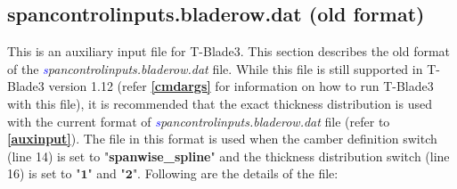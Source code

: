 \documentclass[8pt]{article}
\begin{document}
\subsection{spancontrolinputs.bladerow.dat (old format)}\label{auxinput1}
\noindent
This is an auxiliary input file for T-Blade3. This section describes the old format of the \textit{\textcolor{blue}spancontrolinputs.bladerow.dat} file. While this file is still supported in T-Blade3 version 1.12 (refer \textbf{\ref{cmdargs}} for information on how to run T-Blade3 with this file), it is recommended that the exact thickness distribution is used with the current format of \textit{\textcolor{blue}spancontrolinputs.bladerow.dat} file (refer to \textbf{\ref{auxinput}}). The file in this format is used when the camber definition switch (line 14) is set to "\textbf{spanwise\_spline}" and the thickness distribution switch (line 16) is set to "$\mathbf{1}$" and "$\mathbf{2}$". Following are the details of the file:
\end{document}
